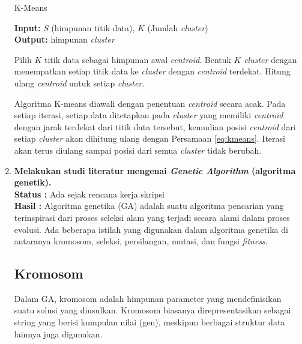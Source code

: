 \documentclass[a4paper,twoside]{article}
\begin{document}
\begin{enumerate}
\begin{algorithm} %
\caption{K-Means} %
\label{alg:kmeans} %
\begin{flushleft}
	\textbf{Input:} $S$ (himpunan titik data), $K$ (Jumlah \textit{cluster})\\
	\textbf{Output:} himpunan \textit{cluster}
\end{flushleft}
\begin{algorithmic}[1] %
	\STATE Pilih $K$ titik data sebagai himpunan awal \textit{centroid}.
	\REPEAT 
		\STATE Bentuk $K$ \textit{cluster} dengan menempatkan setiap titik data ke \textit{cluster} dengan \textit{centroid} terdekat.
		\STATE Hitung ulang \textit{centroid} untuk setiap \textit{cluster}. 
\end{algorithmic}
\end{algorithm}

Algoritma K-means diawali dengan penentuan \textit{centroid} secara acak. Pada setiap iterasi, setiap data ditetapkan pada \textit{cluster} yang memiliki \textit{centroid} dengan jarak terdekat dari titik data tersebut, kemudian posisi \textit{centroid} dari setiap \textit{cluster} akan dihitung ulang dengan Persamaan \ref{eq:kmeans}. Iterasi akan terus diulang sampai posisi dari semua \textit{cluster} tidak berubah.
		
    	\item \textbf{Melakukan studi literatur mengenai {\it Genetic Algorithm} (algoritma genetik).}\\
    	{\bf Status :} Ada sejak rencana kerja skripsi\\
		{\bf Hasil :} Algoritma genetika (GA) adalah suatu algoritma pencarian yang terinspirasi dari proses seleksi alam yang terjadi secara alami dalam proses evolusi. Ada beberapa istilah yang digunakan dalam algoritma genetika di antaranya kromosom, seleksi, persilangan, mutasi, dan fungsi \textit{fitness}.

\subsection*{Kromosom}
\label{sub:chromosome}
Dalam GA, kromosom adalah himpunan parameter yang mendefinisikan suatu solusi yang diusulkan. Kromosom biasanya direpresentasikan sebagai string yang berisi kumpulan nilai (gen), meskipun berbagai struktur data lainnya juga digunakan.


\end{enumerate}
\end{document}
